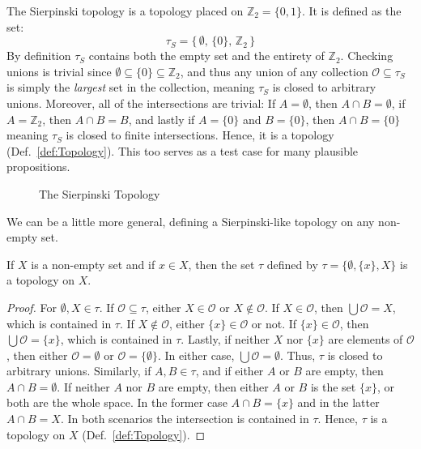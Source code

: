     \begin{example}
        The Sierpinski topology is a topology placed
        on $\mathbb{Z}_{2}=\{0,1\}$. It is defined as the set:
        \begin{equation}
            \tau_{S}=\{\,\emptyset,\,\{0\},\,\mathbb{Z}_{2}\,\}
        \end{equation}
        By definition $\tau_{S}$ contains both the empty set and the entirety of
        $\mathbb{Z}_{2}$. Checking unions is trivial since
        $\emptyset\subseteq\{0\}\subseteq\mathbb{Z}_{2}$, and thus any union of
        any collection $\mathcal{O}\subseteq\tau_{S}$ is simply the
        \textit{largest} set in the collection, meaning $\tau_{S}$ is closed to
        arbitrary unions. Moreover, all of the intersections are trivial:
        If $A=\emptyset$, then $A\cap{B}=\emptyset$, if $A=\mathbb{Z}_{2}$, then
        $A\cap{B}=B$, and lastly if $A=\{0\}$ and $B=\{0\}$, then
        $A\cap{B}=\{0\}$ meaning $\tau_{S}$ is closed to finite intersections.
        Hence, it is a topology (Def.~\ref{def:Topology}). This too serves as a
        test case for many plausible propositions.
    \end{example}
    \begin{figure}[H]
        \centering
        \captionsetup{type=figure}
        
        \caption{The Sierpinski Topology}
        \label{fig:Sierpinksi_Topology}
    \end{figure}
    We can be a little more general, defining a Sierpinski-like topology on any
    non-empty set.
    \begin{theorem}
        \label{thm:Existence_of_Sierpinski_Like_Topology}%
        If $X$ is a non-empty set and if $x\in{X}$, then the set $\tau$ defined
        by $\tau=\{\emptyset,\{x\},X\}$ is a topology on $X$.
    \end{theorem}
    \begin{proof}
        For $\emptyset,X\in\tau$. If $\mathcal{O}\subseteq\tau$, either
        $X\in\mathcal{O}$ or $X\notin\mathcal{O}$. If $X\in\mathcal{O}$, then
        $\bigcup\mathcal{O}=X$, which is contained in $\tau$. If
        $X\notin\mathcal{O}$, either $\{x\}\in\mathcal{O}$ or not. If
        $\{x\}\in\mathcal{O}$, then $\bigcup\mathcal{O}=\{x\}$, which is
        contained in $\tau$. Lastly, if neither $X$ nor $\{x\}$ are elements of
        $\mathcal{O}$, then either $\mathcal{O}=\emptyset$ or
        $\mathcal{O}=\{\emptyset\}$. In either case,
        $\bigcup\mathcal{O}=\emptyset$. Thus, $\tau$ is closed to arbitrary
        unions. Similarly, if $A,B\in\tau$, and if either $A$ or $B$ are empty,
        then $A\cap{B}=\emptyset$. If neither $A$ nor $B$ are empty, then
        either $A$ or $B$ is the set $\{x\}$, or both are the whole space. In
        the former case $A\cap{B}=\{x\}$ and in the latter $A\cap{B}=X$. In
        both scenarios the intersection is contained in $\tau$. Hence,
        $\tau$ is a topology on $X$ (Def.~\ref{def:Topology}).
    \end{proof}
